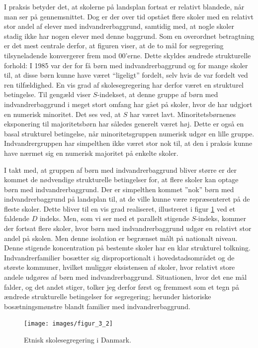 \documentclass[
]{book}
\begin{document}
I praksis betyder det, at skolerne på landsplan fortsat er relativt blandede, når man ser på gennemsnittet. Dog er der over tid opstået flere skoler med en relativt stor andel af elever med indvandrerbaggrund, samtidig med, at nogle skoler stadig ikke har nogen elever med denne baggrund. Som en overordnet betragtning er det mest centrale derfor, at figuren viser, at de to mål for segregering tilsyneladende konvergerer frem mod 00'erne. Dette skyldes ændrede strukturelle forhold: I 1985 var der for få børn med indvandrerbaggrund og for mange skoler til, at disse børn kunne have været ``ligeligt'' fordelt, selv hvis de var fordelt ved ren tilfældighed. En vis grad af skolesegregering har derfor været en strukturel betingelse. Til gengæld viser \(S\)-indekset, at denne gruppe af børn med indvandrerbaggrund i meget stort omfang har gået på skoler, hvor de har udgjort en numerisk minoritet. Det ses ved, at \(S\) har været lavt. Minoritetsbørnenes eksponering til majoritetsbørn har således generelt været høj. Dette er også en basal strukturel betingelse, når minoritetsgruppen numerisk udgør en lille gruppe. Indvandrergruppen har simpelthen ikke været stor nok til, at den i praksis kunne have nærmet sig en numerisk majoritet på enkelte skoler.

I takt med, at gruppen af børn med indvandrerbaggrund bliver større er der kommet de nødvendige strukturelle betingelser for, at flere skoler kan optage børn med indvandrerbaggrund. Der er simpelthen kommet ''nok'' børn med indvandrerbaggrund på landsplan til, at de ville kunne være repræsenteret på de fleste skoler. Dette bliver til en vis grad realiseret, illustreret i figur \ref{fig:fig-4-2} ved et faldende \(D\) indeks. Men, som vi ser med et parallelt stigende \(S\)-indeks, kommer der fortsat flere skoler, hvor børn med indvandrerbaggrund udgør en relativt stor andel på skolen. Men denne isolation er begrænset målt på nationalt niveau. Denne stigende koncentration på bestemte skoler har en klar strukturel tolkning. Indvandrerfamilier bosætter sig disproportionalt i hovedstadsområdet og de største kommuner, hvilket muliggør eksistensen af skoler, hvor relativt store andele udgøres af børn med indvandrerbaggrund. Situationen, hvor det ene mål falder, og det andet stiger, tolker jeg derfor først og fremmest som et tegn på ændrede strukturelle betingelser for segregering; herunder historiske bosætningsmønstre blandt familier med indvandrerbaggrund.

\begin{figure}
\texttt{[image: images/figur\_3\_2]} \caption{Etnisk skolesegregering i Danmark.}\label{fig:fig-4-2}
\end{figure}
\end{document}
